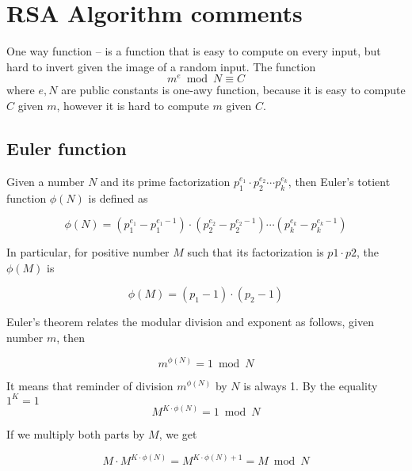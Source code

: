 \chapter{RSA Algorithm comments}\label{ch:rsa-algorithm-comments}
One way function -- is a function that is easy to compute on every input, but hard to invert given the image of a random input.
The function
\[
    m^e \bmod N \equiv C
\]
where $e, N$ are public constants is one-awy function,
because it is easy to compute $C$ given $m$, however it is hard to compute $m$ given $C$.


\section{Euler function}\label{sec:euler-function}
Given a number $N$ and its prime factorization $p_1^{e_1}\cdot p_2^{e_2} \cdots p_k^{e_k}$, then Euler's totient function
$\phi(N)$ is defined as

\[
    \phi(N) = (p_1^{e_1} - p_1^{e_1 - 1}) \cdot (p_2^{e_2} - p_2^{e_2 - 1}) \cdots (p_k^{e_k} - p_k^{e_k - 1})
\]

In particular, for positive number $M$ such that its factorization is $p1 \cdot p2$, the $\phi(M)$ is

\[
    \phi(M) = (p_1 -1) \cdot (p_2 - 1)
\]

Euler's theorem relates the modular division and exponent as follows, given number $m$, then

\[
    m^{\phi(N)} = 1 \bmod N
\]

It means that reminder of division $m^{\phi(N)}$ by $N$ is always 1.
By the equality $1^K = 1$
\[
    M^{K \cdot \phi(N)} = 1 \bmod N
\]

If we multiply both parts by $M$, we get

\[
    M \cdot M^{K \cdot \phi(N)} = M^{K \cdot \phi(N) + 1} = M \bmod N
\]


